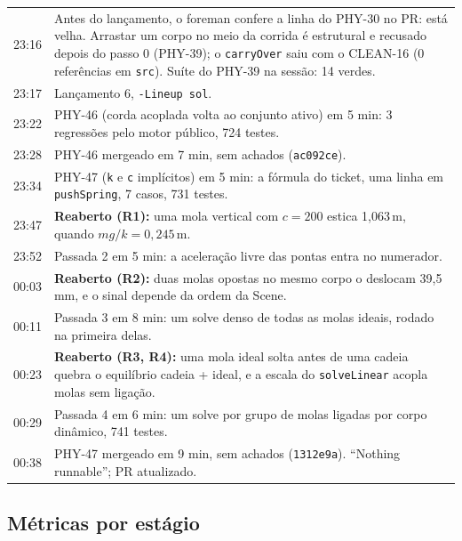 \documentclass[11pt,a4paper]{article}
\begin{document}
\begin{tabularx}{\linewidth}{@{}lX@{}}
\toprule
23:16 & Antes do lançamento, o foreman confere a linha do PHY-30 no PR: está
        velha. Arrastar um corpo no meio da corrida é estrutural e recusado
        depois do passo 0 (PHY-39); o \texttt{carryOver} saiu com o CLEAN-16
        (0 referências em \texttt{src}). Suíte do PHY-39 na sessão: 14
        verdes.\\
23:17 & Lançamento 6, \texttt{-Lineup sol}.\\
23:22 & PHY-46 (corda acoplada volta ao conjunto ativo) em 5 min: 3
        regressões pelo motor público, 724 testes.\\
23:28 & PHY-46 mergeado em 7 min, sem achados (\texttt{ac092ce}).\\
23:34 & PHY-47 (\texttt{k} e \texttt{c} implícitos) em 5 min: a fórmula do
        ticket, uma linha em \texttt{pushSpring}, 7 casos, 731 testes.\\
23:47 & \textbf{Reaberto (R1):} uma mola vertical com $c=200$ estica 1,063\,m,
        quando $mg/k = 0{,}245$\,m.\\
23:52 & Passada 2 em 5 min: a aceleração livre das pontas entra no
        numerador.\\
00:03 & \textbf{Reaberto (R2):} duas molas opostas no mesmo corpo o deslocam
        39,5\,mm, e o sinal depende da ordem da Scene.\\
00:11 & Passada 3 em 8 min: um solve denso de todas as molas ideais, rodado
        na primeira delas.\\
00:23 & \textbf{Reaberto (R3, R4):} uma mola ideal solta antes de uma cadeia
        quebra o equilíbrio cadeia + ideal, e a escala do \texttt{solveLinear}
        acopla molas sem ligação.\\
00:29 & Passada 4 em 6 min: um solve por grupo de molas ligadas por corpo
        dinâmico, 741 testes.\\
00:38 & PHY-47 mergeado em 9 min, sem achados (\texttt{1312e9a}). ``Nothing
        runnable''; PR atualizado.\\
\bottomrule
\end{tabularx}

\subsection{Métricas por estágio}
\end{document}
